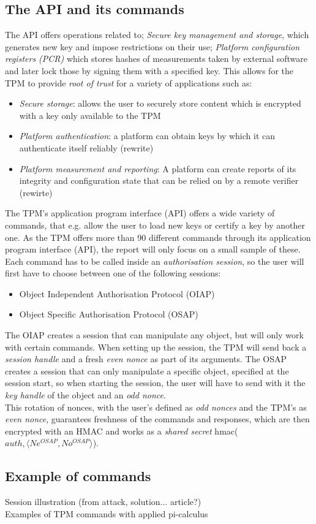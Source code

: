 \subsection{The API and its commands}
The API offers operations related to; \textit{Secure key management and storage}, which generates new key and impose restrictions on their use; \textit{Platform configuration registers (PCR)} which stores hashes of measurements taken by external software and later lock those by signing them with a specified key. This allows for the TPM to provide \textit{root of trust} for a variety of applications such as:
\begin{itemize}
	\item \textit{Secure storage}: allows the user to securely store content which is encrypted with a key only available to the TPM
	\item \textit{Platform authentication}: a platform can obtain keys by which it can authenticate itself reliably (rewrite)
	\item \textit{Platform measurement and reporting}: A platform can create reports of its integrity and configuration state that can be relied on by a remote verifier (rewirte)
\end{itemize}
The TPM's application program interface (API) offers a wide variety of commands, that e.g. allow the user to load new keys or certify a key by another one. As the TPM offers more than 90 different commands through its application program interface (API), the report will only focus on a small sample of these. Each command has to be called inside an \textit{authorisation session}, so the user will first have to choose between one of the following sessions:
\begin{itemize}
  \item Object Independent Authorisation Protocol (OIAP)
  \item Object Specific Authorisation Protocol (OSAP)
\end{itemize}
The OIAP creates a session that can manipulate any object, but will only work with certain commands. When setting up the session, the TPM will send back a \textit{session handle} and a fresh \textit{even nonce} as part of its arguments. 
The OSAP creates a session that can only manipulate a specific object, specified at the session start, so when starting the session, the user will have to send with it the \textit{key handle} of the object and an \textit{odd nonce}. \\
This rotation of nonces, with the user's defined as \textit{odd nonces} and the TPM's as \textit{even nonce}, guarantees freshness of the commands and responses, which are then encrypted with an HMAC and works as a \textit{shared secret} hmac($auth, \langle Ne^{OSAP}, No^{OSAP} \rangle $). 


\subsection{Example of commands}
Session illustration (from attack, solution... article?) \\
Examples of TPM commands with applied pi-calculus

